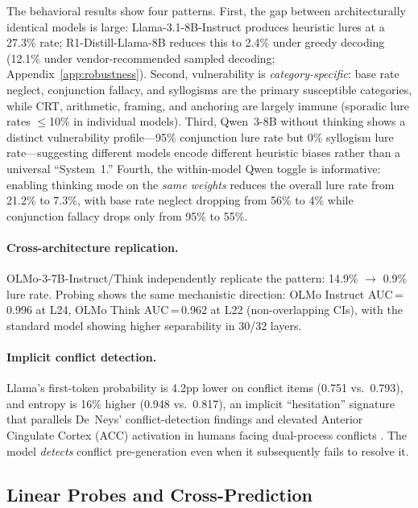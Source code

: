 \documentclass{article}
\begin{document}
The behavioral results show four patterns.  First, the gap between architecturally
identical models is large: Llama-3.1-8B-Instruct produces heuristic
lures at a 27.3\% rate; R1-Distill-Llama-8B reduces this to 2.4\% under
greedy decoding (12.1\% under vendor-recommended sampled decoding;
Appendix~\ref{app:robustness}).  Second, vulnerability is
\emph{category-specific}: base rate neglect, conjunction fallacy, and
syllogisms are the primary susceptible categories, while CRT, arithmetic,
framing, and anchoring are largely immune (sporadic lure rates $\leq$10\%
in individual models).  Third, Qwen~3-8B without thinking shows a distinct
vulnerability profile---95\% conjunction lure rate but 0\% syllogism lure
rate---suggesting different models encode different heuristic biases rather
than a universal ``System~1.''  Fourth, the within-model Qwen toggle is
informative: enabling thinking mode on the \emph{same weights} reduces the
overall lure rate from 21.2\% to 7.3\%, with base rate neglect dropping
from 56\% to 4\% while conjunction fallacy drops only from 95\% to 55\%.

\paragraph{Cross-architecture replication.}
OLMo-3-7B-Instruct/Think \citep{olmo3} independently replicate the
pattern: 14.9\% $\to$ 0.9\% lure rate.  Probing shows the same mechanistic
direction: OLMo Instruct AUC\,=\,0.996 at L24, OLMo Think
AUC\,=\,0.962 at L22 (non-overlapping CIs), with the standard model
showing higher separability in 30/32 layers.

\paragraph{Implicit conflict detection.}
Llama's first-token probability is 4.2pp lower on conflict items (0.751
vs.\ 0.793), and entropy is 16\% higher (0.948 vs.\ 0.817), an implicit
``hesitation'' signature that parallels De~Neys' conflict-detection
findings \citep{deneys2012bias} and elevated Anterior Cingulate Cortex
(ACC) activation in humans facing dual-process conflicts
\citep{botvinick2001conflict}.  The model \emph{detects} conflict
pre-generation even when it subsequently fails to resolve it.

\subsection{Linear Probes and Cross-Prediction}
\label{sec:results_probes}
\end{document}
